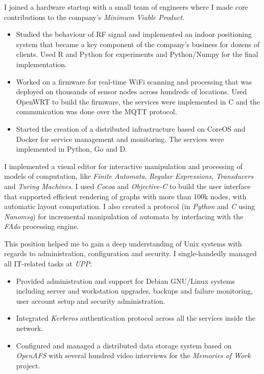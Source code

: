 \documentclass{resume}
\begin{document}
I joined a hardware startup with a small team of engineers where I made core contributions to the company's {\sl Minimum Viable Product}.
\begin{itemize}
  \item Studied the behaviour of {\sf RF} signal and implemented an indoor positioning system that became a key component of the company's business for dozens of clients. Used {\sf R} and {\sf Python} for experiments and {\sf Python/Numpy} for the final implementation.
  \item Worked on a firmware for real-time WiFi scanning and processing that was deployed on thousands of sensor nodes across hundreds of locations. Used {\sf OpenWRT} to build the firmware, the services were implemented in {\sf C} and the communication was done over the {\sf MQTT} protocol.
  \item Started the creation of a distributed infrastructure based on CoreOS and Docker for service management and monitoring. The services were implemented in {\sf Python}, {\sf Go} and {\sf D}.
\end{itemize}


I implemented a visual editor for interactive manipulation and processing of models of computation, like {\em Finite Automata}, {\em Regular Expressions}, {\em Transducers} and {\em Turing Machines}. I used {\em Cocoa} and {\em Objective-C} to build the user interface that supported efficient rendering of graphs with more than 100k nodes, with automatic layout computation. I also created a protocol (in {\em Python} and {\em C} using {\em Nanomsg}) for incremental manipulation of automata by interfacing with the {\em FAdo} processing engine.

This position helped me to gain a deep understanding of Unix systems with regards to administration, configuration and security. I single-handedly managed all IT-related tasks at {\em UPP}:
\begin{itemize}
  \item Provided administration and support for Debian GNU/Linux systems including server and workstation upgrades, backups and failure monitoring, user account setup and security administration.
  \item Integrated {\em Kerberos} authentication protocol across all the services inside the network.
  \item Configured and managed a distributed data storage system based on {\em OpenAFS} with several hundred video interviews for the {\em Memories of Work} project.
\end{itemize}
\end{document}
